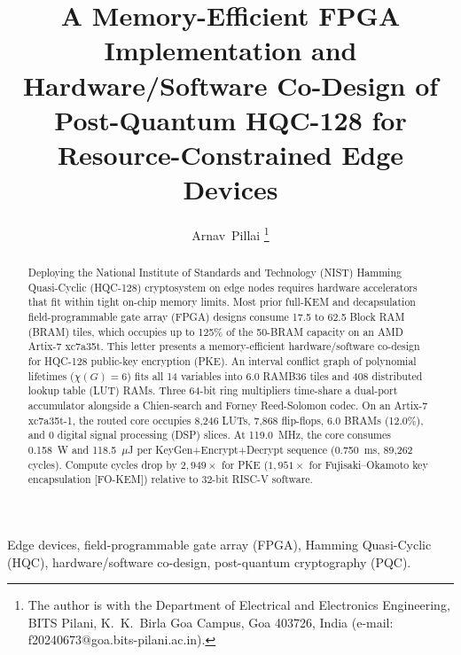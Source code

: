 \documentclass[journal]{IEEEtran}
\begin{document}
\title{A Memory-Efficient FPGA Implementation and Hardware/Software Co-Design of Post-Quantum HQC-128 for Resource-Constrained Edge Devices}

\author{Arnav~Pillai%
\thanks{The author is with the Department of Electrical and Electronics Engineering, BITS Pilani, K.~K.~Birla Goa Campus, Goa 403726, India (e-mail: f20240673@goa.bits-pilani.ac.in).}}

\maketitle

\begin{abstract}
Deploying the National Institute of Standards and Technology (NIST) Hamming Quasi-Cyclic (HQC-128) cryptosystem on edge nodes requires hardware accelerators that fit within tight on-chip memory limits. Most prior full-KEM and decapsulation field-programmable gate array (FPGA) designs consume 17.5 to 62.5 Block RAM (BRAM) tiles, which occupies up to 125\% of the 50-BRAM capacity on an AMD Artix-7 xc7a35t. This letter presents a memory-efficient hardware/software co-design for HQC-128 public-key encryption (PKE). An interval conflict graph of polynomial lifetimes ($\chi(G) = 6$) fits all 14 variables into 6.0 RAMB36 tiles and 408 distributed lookup table (LUT) RAMs. Three 64-bit ring multipliers time-share a dual-port accumulator alongside a Chien-search and Forney Reed-Solomon codec. On an Artix-7 xc7a35t-1, the routed core occupies 8,246 LUTs, 7,868 flip-flops, 6.0 BRAMs (12.0\%), and 0 digital signal processing (DSP) slices. At 119.0~MHz, the core consumes 0.158~W and 118.5~$\mu$J per KeyGen+Encrypt+Decrypt sequence (0.750~ms, 89,262 cycles). Compute cycles drop by $2,949\times$ for PKE ($1,951\times$ for Fujisaki--Okamoto key encapsulation [FO-KEM]) relative to 32-bit RISC-V software.
\end{abstract}

\begin{IEEEkeywords}
Edge devices, field-programmable gate array (FPGA), Hamming Quasi-Cyclic (HQC), hardware/software co-design, post-quantum cryptography (PQC).
\end{IEEEkeywords}
\end{document}

